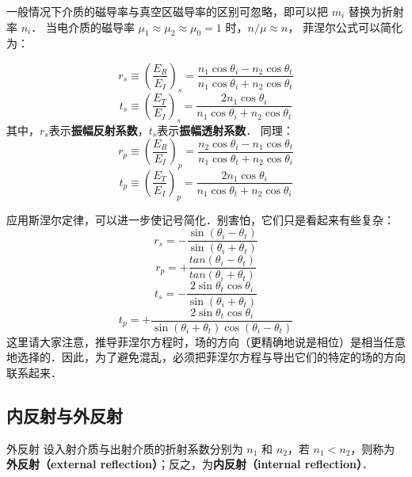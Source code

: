 一般情况下介质的磁导率与真空区磁导率的区别可忽略，即可以把 $m_i$ 替换为折射率 $n_i$． 当电介质的磁导率 $\mu_1\approx\mu_2\approx\mu_0=1$ 时，$n/\mu \approx n$， 菲涅尔公式可以简化为：

\begin{equation}\label{Fresnl_eq3}
r_s \equiv \left(\frac{E_R}{E_I}\right)_s = \frac{n_1\cos{\theta_i} - n_2\cos\theta_t}{n_1\cos\theta_i + n_2\cos\theta_t}
\end{equation}
\begin{equation}\label{Fresnl_eq4}
t_s \equiv \left(\frac{E_T}{E_I}\right)_s =  \frac{2 n_1\cos\theta_i}{n_1\cos\theta_i + n_2\cos\theta_t}
\end{equation}
其中，$r_s$表示\textbf{振幅反射系数}，$t_s$表示\textbf{振幅透射系数}．
同理：
\begin{equation}\label{Fresnl_eq5}
r_p \equiv \left(\frac{E_R}{E_I}\right)_p = \frac{n_2\cos{\theta_i} - n_1\cos\theta_t}{n_1\cos\theta_t + n_2\cos\theta_i}
\end{equation}
\begin{equation}\label{Fresnl_eq6}
t_p \equiv \left(\frac{E_T}{E_I}\right)_p =  \frac{2 n_1\cos\theta_i}{n_1\cos\theta_t + n_2\cos\theta_i}
\end{equation}

应用斯涅尔定律，可以进一步使记号简化．别害怕，它们只是看起来有些复杂：
\begin{equation}\label{Fresnl_eq7}
r_s = -\frac{\sin(\theta_i - \theta_t)}{\sin(\theta_i + \theta_t)}
\end{equation}
\begin{equation}\label{Fresnl_eq8}
r_p = +\frac{tan(\theta_i - \theta_t)}{tan(\theta_i + \theta_t)}
\end{equation}
\begin{equation}\label{Fresnl_eq9}
t_s = -\frac{2\sin\theta_t\cos\theta_i}{\sin(\theta_i + \theta_t)}
\end{equation}
\begin{equation}\label{Fresnl_eq10}
t_p = +\frac{2\sin\theta_t\cos\theta_i}{\sin(\theta_i + \theta_t)\cos(\theta_i - \theta_t)}
\end{equation}
这里请大家注意，推导菲涅尔方程时，场的方向（更精确地说是相位）是相当任意地选择的．因此，为了避免混乱，必须把菲涅尔方程与导出它们的特定的场的方向联系起来．

\subsection{内反射与外反射}
\begin{definition}{外反射}
设入射介质与出射介质的折射系数分别为 $n_1$ 和 $n_2$，若 $n_1<n_2$，则称为\textbf{外反射（external reflection）}；反之，为\textbf{内反射（internal reflection）}．
\end{definition}

